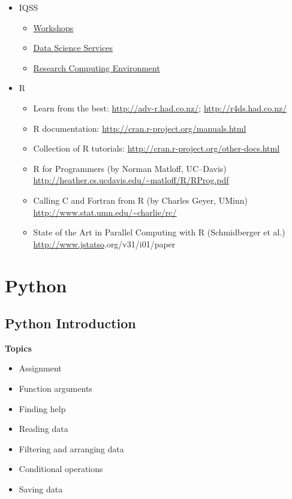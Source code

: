 \documentclass[]{book}
\providecommand{\tightlist}{%
  \setlength{\itemsep}{0pt}\setlength{\parskip}{0pt}}
\begin{document}
\begin{itemize}
\tightlist
\item
  IQSS

  \begin{itemize}
  \tightlist
  \item
    \href{https://dss.iq.harvard.edu/workshop-materials}{Workshops}
  \item
    \href{https://dss.iq.harvard.edu/}{Data Science Services}
  \item
    \href{https://iqss.github.io/dss-rce/}{Research Computing
    Environment}
  \end{itemize}
\item
  R

  \begin{itemize}
  \tightlist
  \item
    Learn from the best: \url{http://adv-r.had.co.nz/};
    \url{http://r4ds.had.co.nz/}
  \item
    R documentation: \url{http://cran.r-project.org/manuals.html}
  \item
    Collection of R tutorials:
    \url{http://cran.r-project.org/other-docs.html}
  \item
    R for Programmers (by Norman Matloff, UC--Davis)
    \url{http://heather.cs.ucdavis.edu/~matloff/R/RProg.pdf}
  \item
    Calling C and Fortran from R (by Charles Geyer, UMinn)
    \url{http://www.stat.umn.edu/~charlie/rc/}
  \item
    State of the Art in Parallel Computing with R (Schmidberger et al.)
    \url{http://www.jstatso}\textbar{}.org/v31/i01/paper
  \end{itemize}
\end{itemize}

\part{Python}\label{part-python}

\chapter{Python Introduction}\label{python-introduction}

\textbf{Topics}

\begin{itemize}
\tightlist
\item
  Assignment
\item
  Function arguments
\item
  Finding help
\item
  Reading data
\item
  Filtering and arranging data
\item
  Conditional operations
\item
  Saving data
\end{itemize}
\end{document}
